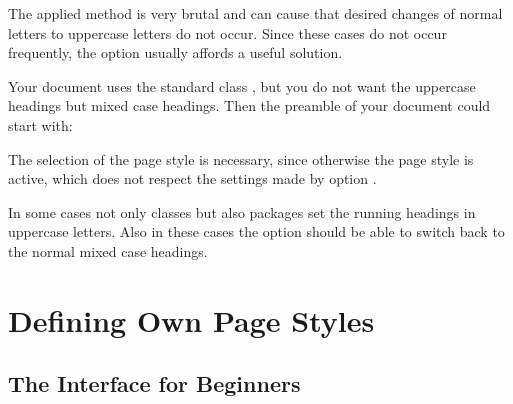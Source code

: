 The applied method is very brutal and can cause that desired changes
of normal letters to uppercase letters  do
not occur.  Since these cases do not occur frequently, the option
 usually affords a useful solution.
\begin{Example}
  Your document uses the standard class ,
  but you do not want the uppercase headings but mixed case
  headings. Then the preamble of your document could start with:
  The selection of the page style  is necessary,
  since otherwise the page style  is active, which
  does not respect the settings made by option .
\end{Example}

In some cases not only classes but also packages set the running
headings in uppercase letters.
Also in these cases the option  should be able
to switch back to the normal mixed case headings.%
%
\EndIndexGroup


\section{Defining Own Page Styles}\label{sec:scrpage-en.UI}
 
\subsection{The Interface for Beginners}\label{sec:scrpage-en.UI.user}

